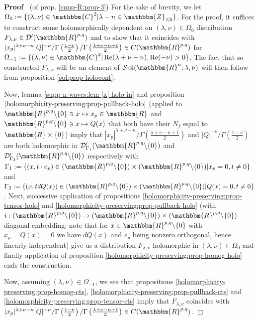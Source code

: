 \documentclass{article}
\newcommand{\assign}{:=}
\newcommand{\tmop}[1]{\ensuremath{\operatorname{#1}}}
\newcommand{\um}{-}
\newenvironment{proof}{\noindent\textbf{Proof\ }}{\hspace*{\fill}$\Box$\medskip}
\numberwithin{definition}{section}
\numberwithin{lemma}{section}
\numberwithin{proposition}{section}
{\theorembodyfont{\rmfamily}\newtheorem{remark}{Remark}
\numberwithin{remark}{section}
}
\begin{document}
\begin{proof}
  (of prop. \ref{supp-R:prop-3}) For the sake of brevity, we let $\Omega_0
  \assign \{ ( \lambda, \nu) \in \mathbbm{C}^2 | \lambda \um n \in
  \mathbbm{Z}_{\leqslant 0} \}$. For the proof, it suffices to construct some
  holomorphically dependent on $( \lambda, \nu) \in \Omega_0$ distribution
  $F_{\lambda, \nu} \in \mathcal{D}' ( \mathbbm{R}^{p, q})$ and to show that
  it coincides with $| x_p |^{\lambda + \nu - n} | Q |^{- \nu} / \Gamma \left(
  \frac{1 - \nu}{2} \right) / \Gamma \left( \frac{\lambda + \nu - n + 1}{2}
  \right) \in C ( \mathbbm{R}^{p, q})$ for $\Omega_{- 1} \assign \{ ( \lambda,
  \nu) \in \mathbbm{C}^2 | \tmop{Re} ( \lambda + \nu - n), \tmop{Re} ( - \nu)
  > 0 \}$. The fact that so constructed $F_{\lambda, \nu}$ will be an element
  of $\mathcal{S} \tmop{ol} ( \mathbbm{R}^n ; \lambda, \nu)$ will then follow
  from proposition \ref{sol:prop-holocont}.
  
  Now, lemma \ref{supp-n-waves:lem-|x|-holo-in} and proposition
  $\ref{holomorphicity-preserving:prop-pullback-holo}$ (applied to
  $\mathbbm{R}^{p, q} \backslash \{ 0 \} \ni x \mapsto x_p \in \mathbbm{R}$
  and $\mathbbm{R}^{p, q} \backslash \{ 0 \} \ni x \mapsto Q ( x)$ that both
  have their $N_f$ equal to $\mathbbm{R} \times \{ 0 \}$) imply that $| x_p
  |^{\lambda + \nu - n} / \Gamma \left( \frac{\lambda + \nu - n + 1}{2}
  \right)$ and $| Q |^{- \nu} / \Gamma \left( \frac{1 - \nu}{2} \right)$ are
  both holomorphic in $\mathcal{D}'_{\Gamma_1} ( \mathbbm{R}^{p, q} \backslash
  \{ 0 \})$ and $\mathcal{D}'_{\Gamma_2} ( \mathbbm{R}^{p, q} \backslash \{ 0
  \})$ respectively with $\Gamma_1 \assign \{ ( x, t \cdot e_p) \in (
  \mathbbm{R}^{p, q} \backslash \{ 0 \}) \times ( \mathbbm{R}^{p, q}
  \backslash \{ 0 \}) | x_p = 0, t \neq 0 \}$ and $\Gamma_2 \assign \{ ( x, t
  d Q ( x)) \in ( \mathbbm{R}^{p, q} \backslash \{ 0 \}) \times (
  \mathbbm{R}^{p, q} \backslash \{ 0 \}) | Q ( x) = 0, t \neq 0 \}$. Next,
  successive application of propositions
  \ref{holomorphicity-preserving:prop-tensor-holo} and
  \ref{holomorphicity-preserving:prop-pullback-holo} (with $i : (
  \mathbbm{R}^{p, q} \backslash \{ 0 \}) \rightarrow ( \mathbbm{R}^{p, q}
  \backslash \{ 0 \}) \times ( \mathbbm{R}^{p, q} \backslash \{ 0 \})$
  diagonal embedding; note that for $x \in \mathbbm{R}^{p, q} \backslash \{ 0
  \}$ with $x_p = Q ( x) = 0$ we have $d Q ( x)$ and $e_p$ being nonzero
  orthogonal, hence linearly independent) give us a distribution $F_{\lambda,
  \nu}$ holomorphic in $( \lambda, \nu) \in \Omega_0$ and finally application
  of proposition \ref{holomorphicity-preserving:prop-homog-holo} ends the
  construction.
  
  Now, assuming $( \lambda, \nu) \in \Omega_{- 1}$, we see that propositions
  \ref{holomorphicity-preserving:prop-homog-cts},
  \ref{holomorphicity-preserving:prop-pullback-cts} and
  \ref{holomorphicity-preserving:prop-tensor-cts} imply that $F_{\lambda,
  \nu}$ coincides with $| x_p |^{\lambda + \nu - n} | Q |^{- \nu} / \Gamma
  \left( \frac{1 - \nu}{2} \right) / \Gamma \left( \frac{\lambda + \nu - n +
  1}{2} \right) \in C ( \mathbbm{R}^{p, q})$.
\end{proof}
\end{document}
